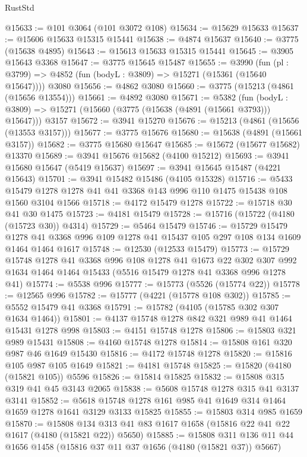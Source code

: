 \begin{lexlean}{RustStd}
\begin{coremodule}
@15633 := @101 @3064 (@101 @3072 @108)
@15634 := @15629 @15633
@15637 := @15606 @15633 @15315 @15441
@15638 := @4874 @15637
@15640 := @3775 (@15638 @4895)
@15643 := @15613 @15633 @15315 @15441
@15645 := @3905 @15643 @3368
@15647 := @3775 @15645 @15487
@15655 := @3990
    (fun (pl : @3799) => @4852 (fun (bodyL : @3809) => @15271 (@15361 (@15640 @15647))))
    @3080
@15656 := @4862 @3080
@15660 := @3775 (@15213 (@4861 (@15656 @13554)))
@15661 := @4892 @3080
@15671 := @5382
    (fun (bodyL : @3809) => @15271 (@15660 (@3775 (@15638 (@4891 (@15661 @3793))) @15647)))
    @3157
@15672 := @3941 @15270
@15676 := @15213 (@4861 (@15656 (@13553 @3157)))
@15677 := @3775 @15676
@15680 := @15638 (@4891 (@15661 @3157))
@15682 := @3775 @15680 @15647
@15685 := @15672 (@15677 @15682) @13370
@15689 := @3941 @15676 @15682 (@4100 @15212)
@15693 := @3941 @15680 @15647 (@5419 @15637)
@15697 := @3941 @15645 @15487 (@4221 @15643)
@15701 := @3941 @15482 @15486 (@4105 @15328)
@15716 := @5433 @15479 @1278 @1278 @41 @41 @3368 @143 @996 @110 @1475 @15438 @108 @1560 @3104 @1566
@15718 := @4172 @15479 @1278
@15722 := @15718 @30 @41 @30 @1475
@15723 := @4181 @15479
@15728 := @15716 (@15722 (@4180 (@15723 @30)) @4314)
@15729 := @5464 @15479
@15746 := @15729
    @15479
    @1278
    @41
    @3368
    @996
    @109
    @1278
    @41
    @15437
    @105
    @297
    @108
    @134
    @1609
    @1464
    @1464
    @1617
@15748 := @12530 (@12533 @15479)
@15773 := @15729
    @15748
    @1278
    @41
    @3368
    @996
    @108
    @1278
    @41
    @1673
    @22
    @302
    @307
    @992
    @1634
    @1464
    @1464
    @15433
    (@5516 @15479 @1278 @41 @3368 @996 @1278 @41)
@15774 := @5538 @996
@15777 := @15773 (@5526 (@15774 @22))
@15778 := @12565 @996
@15782 := @15777 (@4221 (@15778 @108 @302))
@15785 := @5552 @15479 @41 @3368
@15791 := @15782 (@4105 (@15785 @302 @307 @1634 @1464))
@15801 := @4137 @15748 @1278 @842 @321 @989 @41 @1464 @15431 @1278 @998
@15803 := @4151 @15748 @1278
@15806 := @15803 @321 @989 @15431
@15808 := @4160 @15748 @1278
@15814 := @15808 @161 @320 @987 @46 @1649 @15430
@15816 := @4172 @15748 @1278
@15820 := @15816 @105 @987 @105 @1649
@15821 := @4181 @15748
@15825 := @15820 (@4180 (@15821 @105)) @5596
@15826 := @15814 @15825
@15832 := @15808 @315 @319 @41 @45 @3143 @2065
@15838 := @5608 @15748 @1278 @315 @41 @3137 @3141
@15852 := @5618 @15748 @1278 @161 @985 @41 @1649 @314 @1464 @1659 @1278 @1641 @3129 @3133 @15825
@15855 := @15803 @314 @985 @1659
@15870 := @15808 @134 @313 @41 @83 @1617 @1658 (@15816 @22 @41 @22 @1617 (@4180 (@15821 @22)) @5650)
@15885 := @15808 @311 @136 @11 @44 @1656 @1458 (@15816 @37 @11 @37 @1656 (@4180 (@15821 @37)) @5667)

\end{coremodule}
\end{lexlean}
